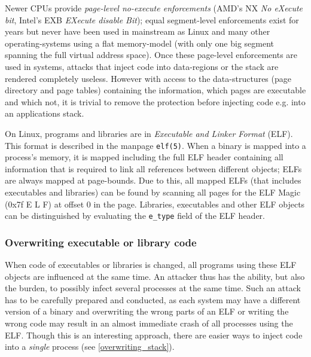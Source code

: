 Newer CPUs provide \emph{page-level no-execute enforcements} (AMD's NX \emph{No
eXecute bit}, Intel's EXB \emph{EXecute disable Bit}); equal segment-level
enforcements exist for years but never have been used in mainstream as Linux and
many other operating-systems using a flat memory-model (with only one big
segment spanning the full virtual address space).  Once these page-level
enforcements are used in systems, attacks that inject code into data-regions or
the stack are rendered completely useless. However with access to the
data-structures (page directory and page tables) containing the information,
which pages are executable and which not, it is trivial to remove the protection
before injecting code e.g\@. into an applications stack. 

On Linux, programs and libraries are in \emph{Executable and Linker Format}
(ELF).  This format is described in the manpage \texttt{elf(5)}. When a binary
is mapped into a process's memory, it is mapped including the full ELF header
containing all information that is required to link all references between
different objects; ELFs are always mapped at page-bounds. Due to this, all
mapped ELFs (that includes executables and libraries) can be found by scanning
all pages for the ELF Magic (0x7f E L F) at offset $0$ in the page.  Libraries,
executables and other ELF objects can be distinguished by evaluating the
\texttt{e\_type} field of the ELF header.

\subsubsection{Overwriting executable or library code}

When code of executables or libraries is changed, all programs using these ELF
objects are influenced at the same time. An attacker thus has the ability, but
also the burden, to possibly infect several processes at the same time. Such an
attack has to be carefully prepared and conducted, as each system may have a
different version of a binary and overwriting the wrong parts of an ELF or
writing the wrong code may result in an almost immediate crash of all processes
using the ELF. Though this is an interesting approach, there are easier ways to
inject code into a \emph{single} process (see \ref{overwriting_stack}).

